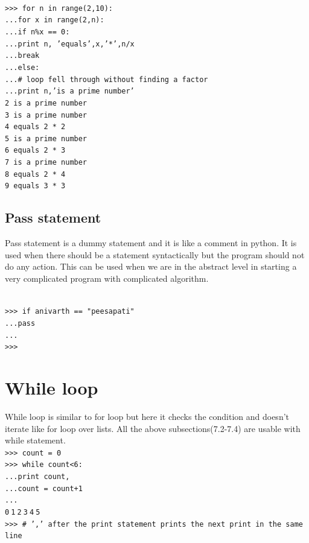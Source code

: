 \documentclass[12pt,a4paper]{article}
\begin{document}
\texttt{
\\
>>> for n in range(2,10):\\
...\hspace{30pt}for x in range(2,n):\\
...\hspace{30pt}\hspace{30pt}if n\%x == 0:\\
...\hspace{90pt}print n, 'equals',x,'*',n/x\\
...\hspace{90pt}break\\
...\hspace{30pt}else:\\
...\hspace{60pt}\# loop fell through without finding a factor\\
...\hspace{60pt}print n,'is a prime number'\\
2 is a prime number\\
3 is a prime number\\
4 equals 2 * 2\\
5 is a prime number\\
6 equals 2 * 3\\
7 is a prime number\\
8 equals 2 * 4\\
9 equals 3 * 3\\
}

\subsection{Pass statement}
Pass statement is a dummy statement and it is like a comment in python. It is used when there should be a statement syntactically but the program should not do any action. This can be used when we are in the abstract level in starting a very complicated program with complicated algorithm.

\texttt{
\\
>>> if anivarth == "peesapati"\\
...\hspace{30pt}pass\\
...\\
>>>\\}
\section{While loop}
While loop is similar to for loop but here it checks the condition and doesn't iterate like for loop over lists. All the above subsections(7.2-7.4) are usable with while statement.
\texttt{\\
>>> count = 0\\
>>> while count<6:\\
...\hspace{30pt}print count,\\
...\hspace{30pt}count = count+1\\
...\\
0$\:$1$\:$2$\:$3$\:$4$\:$5\\
>>> \# ',' after the print statement prints the next print in the same line}
\end{document}
